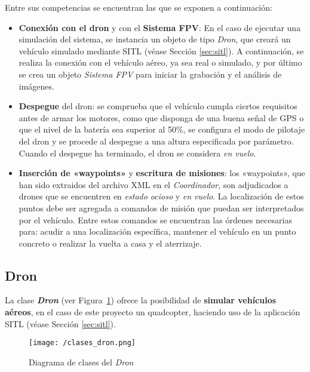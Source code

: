 Entre sus competencias se encuentran las que se exponen a continuación:
\begin{itemize}
\item \textbf{Conexión con el dron} y con el \textbf{Sistema FPV}: En el caso de ejecutar una simulación del sistema, se instancia un objeto de tipo \textit{Dron}, que creará un vehículo simulado mediante \acs{SITL} (véase Sección \ref{sec:sitl}). A continuación, se realiza la conexión con el vehículo aéreo, ya sea real o simulado, y por último se crea un objeto \textit{Sistema FPV} para iniciar la grabación y el análisis de imágenes.
\item \textbf{Despegue} del dron: se comprueba que el vehículo cumpla ciertos requisitos antes de armar los motores, como que disponga de una buena señal de \acs{GPS} o que el nivel de la batería sea superior al 50\%, se configura el modo de pilotaje del dron y se procede al despegue a una altura especificada por parámetro. Cuando el despegue ha terminado, el dron se considera \textit{en vuelo}. 
\item \textbf{Inserción de «waypoints»} y \textbf{escritura de misiones}: los «waypoints», que han sido extraidos del archivo XML en el \textit{Coordinador}, son adjudicados a drones que se encuentren en \textit{estado ocioso} y \textit{en vuelo}. La localización de estos puntos debe ser agregada a comandos de misión que puedan ser interpretados por el vehículo. Entre estos comandos se encuentran las órdenes necesarias para: acudir a una localización específica, mantener el vehículo en un punto concreto o realizar la vuelta a casa y el aterrizaje.
\end{itemize}

\subsection{Dron}
\label{sec:dron}

La clase \textbf{\textit{Dron}} (ver Figura~\ref{fig:diagclasesdron}) ofrece la posibilidad de \textbf{simular vehículos aéreos}, en el caso de este proyecto un quadcopter, haciendo uso de la aplicación \acs{SITL} (véase Sección \ref{sec:sitl}).

\begin{figure}[!h]
\begin{center}
\texttt{[image: /clases\_dron.png]}
\caption[Diagrama de clases del \textit{Dron}]{Diagrama de clases del \textit{Dron}}
\label{fig:diagclasesdron}
\end{center}
\end{figure}

